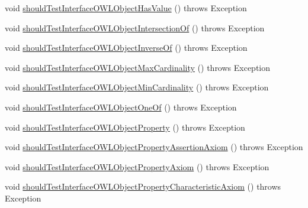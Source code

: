 \begin{DoxyCompactItemize}
\item 
void \hyperlink{classorg_1_1semanticweb_1_1owlapi_1_1contract_1_1_contract_owlapi_model__3_test_a4241983e7a7702cf860c188048a55aa2}{should\-Test\-Interface\-O\-W\-L\-Object\-Has\-Value} ()  throws Exception 
\item 
void \hyperlink{classorg_1_1semanticweb_1_1owlapi_1_1contract_1_1_contract_owlapi_model__3_test_aa34ec8f3216aa0b00d8da82992385004}{should\-Test\-Interface\-O\-W\-L\-Object\-Intersection\-Of} ()  throws Exception 
\item 
void \hyperlink{classorg_1_1semanticweb_1_1owlapi_1_1contract_1_1_contract_owlapi_model__3_test_a7f09278da566d03da8e65d70a3460a27}{should\-Test\-Interface\-O\-W\-L\-Object\-Inverse\-Of} ()  throws Exception 
\item 
void \hyperlink{classorg_1_1semanticweb_1_1owlapi_1_1contract_1_1_contract_owlapi_model__3_test_aabf76567fd3f10acb21b370aab90243e}{should\-Test\-Interface\-O\-W\-L\-Object\-Max\-Cardinality} ()  throws Exception 
\item 
void \hyperlink{classorg_1_1semanticweb_1_1owlapi_1_1contract_1_1_contract_owlapi_model__3_test_ac94ec9c969b26899a301f6ef651e5c18}{should\-Test\-Interface\-O\-W\-L\-Object\-Min\-Cardinality} ()  throws Exception 
\item 
void \hyperlink{classorg_1_1semanticweb_1_1owlapi_1_1contract_1_1_contract_owlapi_model__3_test_ae593f22b1bea48c39ad272c216540382}{should\-Test\-Interface\-O\-W\-L\-Object\-One\-Of} ()  throws Exception 
\item 
void \hyperlink{classorg_1_1semanticweb_1_1owlapi_1_1contract_1_1_contract_owlapi_model__3_test_afb0fb4ae7aee6499776d1e6fee987e01}{should\-Test\-Interface\-O\-W\-L\-Object\-Property} ()  throws Exception 
\item 
void \hyperlink{classorg_1_1semanticweb_1_1owlapi_1_1contract_1_1_contract_owlapi_model__3_test_a10391df162cd6d11e34ad4c6ea20a398}{should\-Test\-Interface\-O\-W\-L\-Object\-Property\-Assertion\-Axiom} ()  throws Exception 
\item 
void \hyperlink{classorg_1_1semanticweb_1_1owlapi_1_1contract_1_1_contract_owlapi_model__3_test_a37584bae7ebbc100eedd60df4cb09b3e}{should\-Test\-Interface\-O\-W\-L\-Object\-Property\-Axiom} ()  throws Exception 
\item 
void \hyperlink{classorg_1_1semanticweb_1_1owlapi_1_1contract_1_1_contract_owlapi_model__3_test_a1e46cc52b0366d691cfaed588aba086d}{should\-Test\-Interface\-O\-W\-L\-Object\-Property\-Characteristic\-Axiom} ()  throws Exception 
\item 

\end{DoxyCompactItemize}
